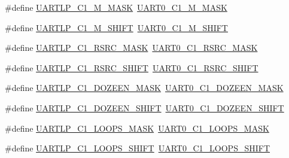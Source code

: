 \begin{DoxyCompactItemize}
\item 
\#define \hyperlink{group___backward___compatibility___symbols_gaf7b253cfe0dae018953b5a5f7e696beb}{U\+A\+R\+T\+L\+P\+\_\+\+C1\+\_\+\+M\+\_\+\+M\+A\+SK}~\hyperlink{group___u_a_r_t0___register___masks_gabdd6ccef43f8d2a143ed2cbd16b94cf1}{U\+A\+R\+T0\+\_\+\+C1\+\_\+\+M\+\_\+\+M\+A\+SK}
\item 
\#define \hyperlink{group___backward___compatibility___symbols_ga7f948b34e2c66421e265c5d499e87db6}{U\+A\+R\+T\+L\+P\+\_\+\+C1\+\_\+\+M\+\_\+\+S\+H\+I\+FT}~\hyperlink{group___u_a_r_t0___register___masks_ga8d31680c97fb0821a0613ea8edc4982e}{U\+A\+R\+T0\+\_\+\+C1\+\_\+\+M\+\_\+\+S\+H\+I\+FT}
\item 
\#define \hyperlink{group___backward___compatibility___symbols_gaa53951441e58bf423d327892a23aa074}{U\+A\+R\+T\+L\+P\+\_\+\+C1\+\_\+\+R\+S\+R\+C\+\_\+\+M\+A\+SK}~\hyperlink{group___u_a_r_t0___register___masks_ga746b65fa3c8e5bb60aa81f98984ea2a3}{U\+A\+R\+T0\+\_\+\+C1\+\_\+\+R\+S\+R\+C\+\_\+\+M\+A\+SK}
\item 
\#define \hyperlink{group___backward___compatibility___symbols_ga4edf9821b67824b0fdd4931c27ce452d}{U\+A\+R\+T\+L\+P\+\_\+\+C1\+\_\+\+R\+S\+R\+C\+\_\+\+S\+H\+I\+FT}~\hyperlink{group___u_a_r_t0___register___masks_ga6c6190c9625b3cae766cb5e83ec51ee9}{U\+A\+R\+T0\+\_\+\+C1\+\_\+\+R\+S\+R\+C\+\_\+\+S\+H\+I\+FT}
\item 
\#define \hyperlink{group___backward___compatibility___symbols_gaa700bb55bfafb472644d0616a9488c97}{U\+A\+R\+T\+L\+P\+\_\+\+C1\+\_\+\+D\+O\+Z\+E\+E\+N\+\_\+\+M\+A\+SK}~\hyperlink{group___u_a_r_t0___register___masks_ga96d43575fd3133661535f83017c89298}{U\+A\+R\+T0\+\_\+\+C1\+\_\+\+D\+O\+Z\+E\+E\+N\+\_\+\+M\+A\+SK}
\item 
\#define \hyperlink{group___backward___compatibility___symbols_ga643a9b2d4426aa5f6cd371cf81b95404}{U\+A\+R\+T\+L\+P\+\_\+\+C1\+\_\+\+D\+O\+Z\+E\+E\+N\+\_\+\+S\+H\+I\+FT}~\hyperlink{group___u_a_r_t0___register___masks_ga5d6e4f4ab4b49ca54f600ff72198acbb}{U\+A\+R\+T0\+\_\+\+C1\+\_\+\+D\+O\+Z\+E\+E\+N\+\_\+\+S\+H\+I\+FT}
\item 
\#define \hyperlink{group___backward___compatibility___symbols_gabf6750c9bbd5add41b650fcb0e2f3cc9}{U\+A\+R\+T\+L\+P\+\_\+\+C1\+\_\+\+L\+O\+O\+P\+S\+\_\+\+M\+A\+SK}~\hyperlink{group___u_a_r_t0___register___masks_ga652e29ee005896dc658da4a9f4b45648}{U\+A\+R\+T0\+\_\+\+C1\+\_\+\+L\+O\+O\+P\+S\+\_\+\+M\+A\+SK}
\item 
\#define \hyperlink{group___backward___compatibility___symbols_ga15b68685a3a0931d93b4848953390d10}{U\+A\+R\+T\+L\+P\+\_\+\+C1\+\_\+\+L\+O\+O\+P\+S\+\_\+\+S\+H\+I\+FT}~\hyperlink{group___u_a_r_t0___register___masks_ga314b9a28f9ddde7c21b9c62b8bbab5a4}{U\+A\+R\+T0\+\_\+\+C1\+\_\+\+L\+O\+O\+P\+S\+\_\+\+S\+H\+I\+FT}

\end{DoxyCompactItemize}

